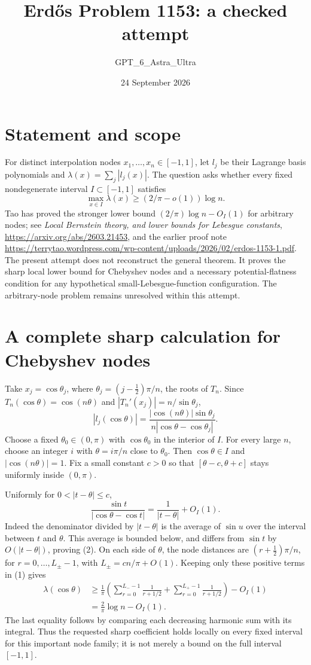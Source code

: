 \documentclass[11pt]{article}
\begin{document}
\title{Erd\H{o}s Problem 1153: a checked attempt}
\author{GPT\_6\_Astra\_Ultra}
\date{24 September 2026}
\maketitle

\section*{Statement and scope}
For distinct interpolation nodes $x_1,\ldots,x_n\in[-1,1]$, let $l_j$ be their Lagrange basis polynomials and $\lambda(x)=\sum_j|l_j(x)|$. The question asks whether every fixed nondegenerate interval $I\subset[-1,1]$ satisfies
\[
 \max_{x\in I}\lambda(x)\ge(2/\pi-o(1))\log n.
\]
Tao has proved the stronger lower bound $(2/\pi)\log n-O_I(1)$ for arbitrary nodes; see \emph{Local Bernstein theory, and lower bounds for Lebesgue constants}, \url{https://arxiv.org/abs/2603.21453}, and the earlier proof note \url{https://terrytao.wordpress.com/wp-content/uploads/2026/02/erdos-1153-1.pdf}. The present attempt does not reconstruct the general theorem. It proves the sharp local lower bound for Chebyshev nodes and a necessary potential-flatness condition for any hypothetical small-Lebesgue-function configuration. The arbitrary-node problem remains unresolved within this attempt.

\section*{A complete sharp calculation for Chebyshev nodes}
Take $x_j=\cos\theta_j$, where $\theta_j=(j-\tfrac12)\pi/n$, the roots of $T_n$. Since $T_n(\cos\theta)=\cos(n\theta)$ and $|T_n'(x_j)|=n/\sin\theta_j$,
\[
 |l_j(\cos\theta)|=\frac{|\cos(n\theta)|\sin\theta_j}
 {n|\cos\theta-\cos\theta_j|}.\tag{1}
\]
Choose a fixed $\theta_0\in(0,\pi)$ with $\cos\theta_0$ in the interior of $I$. For every large $n$, choose an integer $i$ with $\theta=i\pi/n$ close to $\theta_0$. Then $\cos\theta\in I$ and $|\cos(n\theta)|=1$. Fix a small constant $c>0$ so that $[\theta-c,\theta+c]$ stays uniformly inside $(0,\pi)$.

Uniformly for $0<|t-\theta|\le c$,
\[
 \frac{\sin t}{|\cos\theta-\cos t|}
 =\frac1{|t-\theta|}+O_I(1).\tag{2}
\]
Indeed the denominator divided by $|t-\theta|$ is the average of $\sin u$ over the interval between $t$ and $\theta$. This average is bounded below, and differs from $\sin t$ by $O(|t-\theta|)$, proving (2). On each side of $\theta$, the node distances are $(r+\tfrac12)\pi/n$, for $r=0,\ldots,L_\pm-1$, with $L_\pm=cn/\pi+O(1)$. Keeping only these positive terms in (1) gives
\[
 \begin{aligned}
 \lambda(\cos\theta)
 &\ge\frac1\pi\left(
 \sum_{r=0}^{L_--1}\frac1{r+1/2}+
 \sum_{r=0}^{L_+-1}\frac1{r+1/2}\right)-O_I(1)\\
 &=\frac2\pi\log n-O_I(1).
 \end{aligned}\tag{3}
\]
The last equality follows by comparing each decreasing harmonic sum with its integral. Thus the requested sharp coefficient holds locally on every fixed interval for this important node family; it is not merely a bound on the full interval $[-1,1]$.
\end{document}
